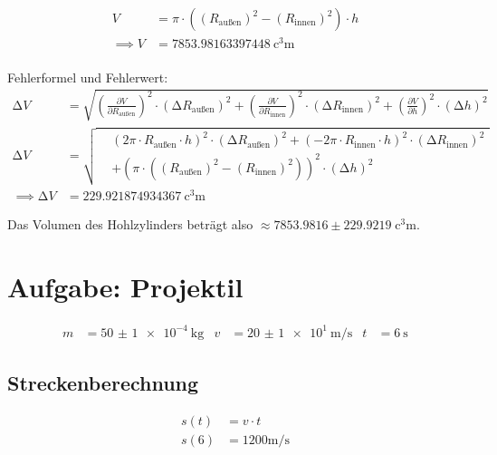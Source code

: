 \begin{align}
    V &=\pi \cdot ((R_\text{außen})^2 - (R_\text{innen})^2) \cdot h \\ \nonumber
    \implies V &= \SI{7853.98163397448}{\cubic\centi\metre} \nonumber
\end{align}
\\
Fehlerformel und Fehlerwert:
\begin{align}
    \increment V &= \sqrt{
        \left(\frac{\partial V}{\partial R_\text{außen} }\right)^2 \cdot \left(\increment R_\text{außen} \right)^2 +
        \left(\frac{\partial V}{\partial R_\text{innen} }\right)^2 \cdot \left(\increment R_\text{innen} \right)^2 +
        \left(\frac{\partial V}{\partial h }\right)^2 \cdot \left(\increment h \right)^2
        }\\ \nonumber
\increment V&=
\sqrt{
\begin{aligned}
        & \left(
        2 \pi \cdot R_\text{außen} \cdot h \right) ^2 \cdot (\increment R_\text{außen} )^2
        + \left( -2 \pi \cdot R_\text{innen} \cdot h \right) ^2 \cdot (\increment R_\text{innen} )^2 \\
        &+ \left( \pi \cdot ((R_\text{außen})^2 - (R_\text{innen})^2) \right) ^2 \cdot (\increment h )^2
\end{aligned} \nonumber
}\\
\implies \increment V &= \SI{229.921874934367}{\cubic\centi\metre} \nonumber \nonumber
\end{align}
            
Das Volumen des Hohlzylinders beträgt also $\approx7853.9816\pm 229.9219\; \si{\cubic\centi\metre}$.

\section{Aufgabe: Projektil}

\begin{align}
    m&=\SI{50(1)e-4}{\kilo\gram} & v&=\SI{20(1)e1}{\metre\per\second} & t&=\SI{6}{\second} \nonumber
\end{align}

\subsection{Streckenberechnung}

\begin{align*}
    s(t)&=v\cdot t \\
    s(6)&= 1200 \si{\metre\per\second}
\end{align*}

